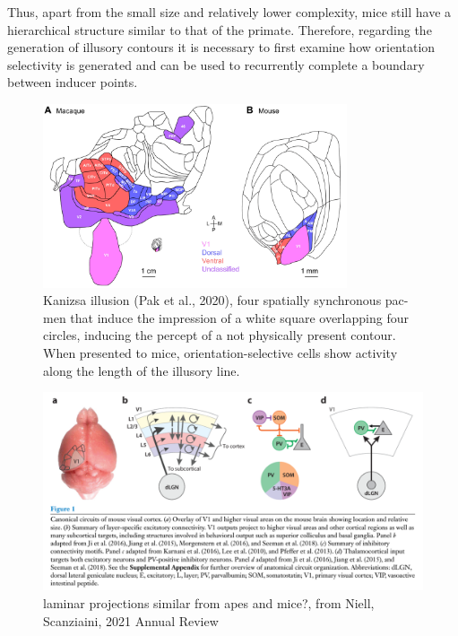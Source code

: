 \documentclass[12pt]{article}
\begin{document}
Thus, apart from the small size and relatively lower complexity, mice still have a hierarchical structure similar to that of the primate. Therefore, regarding the generation of illusory contours it is necessary to first examine how orientation selectivity is generated and can be used to recurrently complete a boundary between inducer points.

\begin{figure}[H]
  \centering
  \includegraphics[width=0.8\textwidth]{figures/compared_cortex.png}
  \caption{Kanizsa illusion (Pak et al., 2020), four spatially synchronous pac-men that induce the impression of a white square overlapping four circles, inducing the percept of a not physically present contour. When presented to mice, orientation-selective cells show activity along the length of the illusory line.}
  \label{fig:simple_abutting}
\end{figure}

\begin{figure}[H]
  \centering
  \includegraphics[width=0.8 \textwidth]{figures/Canonical_laminar_projection.png}
  \caption{laminar projections similar from apes and mice?, from Niell, Scanziaini, 2021 Annual Review}
  \label{fig:figure 3}
\end{figure}


\end{document}
